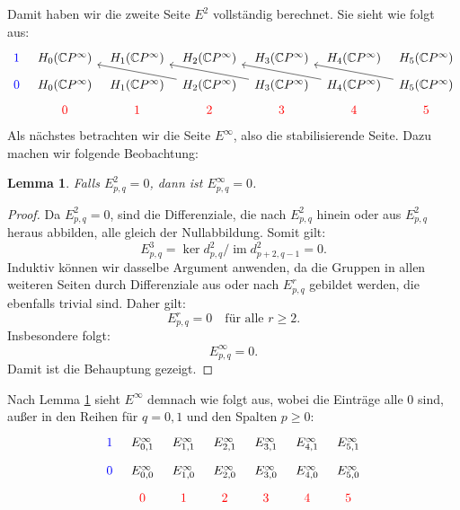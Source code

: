 \documentclass[12pt]{article}
\numberwithin{conj}{section}
\newtheorem{lemma}[conj]{Lemma}
\begin{document}
    Damit haben wir die zweite Seite $E^{2}$ vollständig berechnet. Sie sieht wie folgt
    aus:
    \[
        \begin{tikzcd}
            [sep=tiny] {\color{blue}1} & {H_0(\mathbb{C}P^\infty)} & {H_1(\mathbb{C}P^\infty)}
            & {H_2(\mathbb{C}P^\infty)} & {H_3(\mathbb{C}P^\infty)} & {H_4(\mathbb{C}P^\infty)}
            & {H_5(\mathbb{C}P^\infty)} \\ {\color{blue}0} & {H_0(\mathbb{C}P^\infty)}
            & {H_1(\mathbb{C}P^\infty)} & {H_2(\mathbb{C}P^\infty)} & {H_3(\mathbb{C}P^\infty)}
            & {H_4(\mathbb{C}P^\infty)} & {H_5(\mathbb{C}P^\infty)} \\ & {\color{red}0}
            & {\color{red}1} & {\color{red}2} & {\color{red}3} & {\color{red}4} & {\color{red}5}
            \arrow[from=2-4, to=1-2] \arrow[from=2-5, to=1-3] \arrow[from=2-6, to=1-4]
            \arrow[from=2-7, to=1-5]
        \end{tikzcd}
    \]
    Als nächstes betrachten wir die Seite $E^{\infty}$, also die stabilisierende Seite.
    Dazu machen wir folgende Beobachtung:

    \begin{lemma}
        \label{lemma:infinitysection} Falls $E^{2}_{p,q}= 0$, dann ist
        $E^{\infty}_{p,q}= 0$.
    \end{lemma}

    \begin{proof}
        Da $E^{2}_{p,q}= 0$, sind die Differenziale, die nach $E^{2}_{p,q}$ hinein oder
        aus $E^{2}_{p,q}$ heraus abbilden, alle gleich der Nullabbildung. Somit gilt:
        \[
            E^{3}_{p,q}= \ker d^{2}_{p,q}  / \operatorname{im} d^{2}_{p+2,q-1} = 0.
        \]
        Induktiv können wir dasselbe Argument anwenden, da die Gruppen in allen weiteren
        Seiten durch Differenziale aus oder nach $E^{r}_{p,q}$ gebildet werden, die
        ebenfalls trivial sind. Daher gilt:
        \[
            E^{r}_{p,q}= 0 \quad \text{für alle }r \geq 2.
        \]
        Insbesondere folgt:
        \[
            E^{\infty}_{p,q}= 0.
        \]
        Damit ist die Behauptung gezeigt.
    \end{proof}

    Nach Lemma \ref{lemma:infinitysection} sieht $E^{\infty}$ demnach wie folgt
    aus, wobei die Einträge alle $0$ sind, außer in den Reihen für $q = 0,1$ und
    den Spalten $p \geq 0$:
    \[
        \begin{tikzcd}
            [sep=tiny] {\color{blue}1} & {E^\infty_{0,1}} & {E^\infty_{1,1}} & {E^\infty_{2,1}}
            & {E^\infty_{3,1}} & {E^\infty_{4,1}} & {E^\infty_{5,1}} \\ {\color{blue}0}
            & {E^\infty_{0,0}} & {E^\infty_{1,0}} & {E^\infty_{2,0}} & {E^\infty_{3,0}}
            & {E^\infty_{4,0}} & {E^\infty_{5,0}} \\ & {\color{red}0} & {\color{red}1}
            & {\color{red}2} & {\color{red}3} & {\color{red}4} & {\color{red}5}
        \end{tikzcd}
    \]
\end{document}
